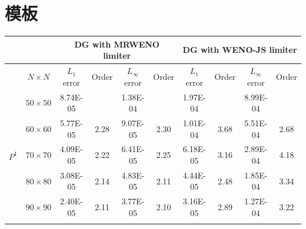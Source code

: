 \documentclass{book}
\begin{document}
\section{模板}
\begin{table}[ht]
    \small
    \centering
    \begin{tabular}{|c|c|cccc|cccc|}
        \hline
                               &                 & \multicolumn{4}{c|}{DG   with MRWENO limiter} & \multicolumn{4}{c|}{DG   with WENO-JS limiter}                                                                                                                                                                 \\ \hline
                               & $N\times N$     & \multicolumn{1}{c|}{$L_1$ error}              & \multicolumn{1}{c|}{Order}                     & \multicolumn{1}{c|}{$L_\infty$ error} & Order & \multicolumn{1}{c|}{$L_1$ error} & \multicolumn{1}{c|}{Order} & \multicolumn{1}{c|}{$L_\infty$ error} & Order \\ \hline
        \multirow{6}{*}{$P^1$} & $50\times 50$   & \multicolumn{1}{c|}{8.74E-05}                 & \multicolumn{1}{c|}{}                          & \multicolumn{1}{c|}{1.38E-04}         &       & \multicolumn{1}{c|}{1.97E-04}    & \multicolumn{1}{c|}{}      & \multicolumn{1}{c|}{8.99E-04}         &       \\ \cline{2-10}
                               & $60\times 60$   & \multicolumn{1}{c|}{5.77E-05}                 & \multicolumn{1}{c|}{2.28}                      & \multicolumn{1}{c|}{9.07E-05}         & 2.30  & \multicolumn{1}{c|}{1.01E-04}    & \multicolumn{1}{c|}{3.68}  & \multicolumn{1}{c|}{5.51E-04}         & 2.68  \\ \cline{2-10}
                               & $70\times 70$   & \multicolumn{1}{c|}{4.09E-05}                 & \multicolumn{1}{c|}{2.22}                      & \multicolumn{1}{c|}{6.41E-05}         & 2.25  & \multicolumn{1}{c|}{6.18E-05}    & \multicolumn{1}{c|}{3.16}  & \multicolumn{1}{c|}{2.89E-04}         & 4.18  \\ \cline{2-10}
                               & $80\times 80$   & \multicolumn{1}{c|}{3.08E-05}                 & \multicolumn{1}{c|}{2.14}                      & \multicolumn{1}{c|}{4.83E-05}         & 2.11  & \multicolumn{1}{c|}{4.44E-05}    & \multicolumn{1}{c|}{2.48}  & \multicolumn{1}{c|}{1.85E-04}         & 3.34  \\ \cline{2-10}
                               & $90\times 90$   & \multicolumn{1}{c|}{2.40E-05}                 & \multicolumn{1}{c|}{2.11}                      & \multicolumn{1}{c|}{3.77E-05}         & 2.10  & \multicolumn{1}{c|}{3.16E-05}    & \multicolumn{1}{c|}{2.89}  & \multicolumn{1}{c|}{1.27E-04}         & 3.22  \\ \cline{2-10}

\end{tabular}
\end{table}
\end{document}
